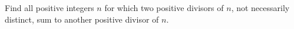 Find all positive integers $n$ for which two positive divisors of $n$, not necessarily distinct, sum to another positive divisor of $n$.
